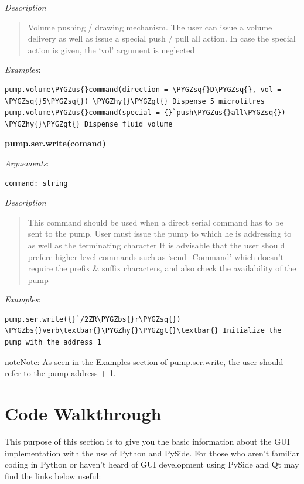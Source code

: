 \documentclass[letterpaper,10pt,english]{sphinxmanual}
\def\PYGZbs{\char`\\}
\def\PYGZus{\char`\_}
\def\PYGZgt{\char`\>}
\def\PYGZhy{\char`\-}
\def\PYGZsq{\char`\'}
\begin{document}
\emph{Description}
\begin{quote}

Volume pushing / drawing mechanism. The user can issue a volume delivery as well
as issue a special push / pull all action. In case the special action is given,
the  `vol' argument is neglected
\end{quote}

\emph{Examples}:

\begin{Verbatim}[commandchars=\\\{\}]
pump.volume\PYGZus{}command(direction = \PYGZsq{}D\PYGZsq{}, vol = \PYGZsq{}5\PYGZsq{}) \PYGZhy{}\PYGZgt{} Dispense 5 microlitres
pump.volume\PYGZus{}command(special = {}`push\PYGZus{}all\PYGZsq{}) \PYGZhy{}\PYGZgt{} Dispense fluid volume
\end{Verbatim}

\textbf{pump.ser.write(comand)}

\emph{Arguements}:

\begin{Verbatim}[commandchars=\\\{\}]
command: string
\end{Verbatim}

\emph{Description}
\begin{quote}

This command should be used when a direct serial command has to be sent to the pump.
User must issue the pump to which he is addressing to as well as the terminating character
It is advisable that the user should prefere higher level commands such as `send\_Command'
which doesn't require the prefix \& suffix characters, and also check the availability of the pump
\end{quote}

\emph{Examples}:

\begin{Verbatim}[commandchars=\\\{\}]
pump.ser.write({}`/2ZR\PYGZbs{}r\PYGZsq{}) \PYGZbs{}verb\textbar{}\PYGZhy{}\PYGZgt{}\textbar{} Initialize the pump with the address 1
\end{Verbatim}

\begin{notice}{note}{Note:}
As seen in the Examples section of pump.ser.write, the user should refer to the pump
address + 1.
\end{notice}


\section{Code Walkthrough}
\label{code-walkthrough:code-walkthrough}\label{code-walkthrough::doc}
This purpose of this section is to give you the basic information about the GUI
implementation with the use of Python and PySide.
For those who aren't familiar coding in Python or haven't heard of GUI development using PySide
and Qt may find the links below useful:
\end{document}
